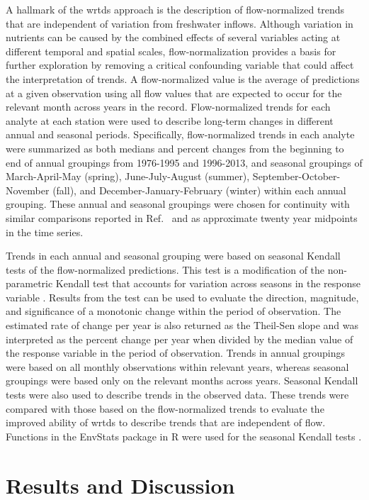 \documentclass[journal = esthag, manuscript = article]{achemso}\usepackage[]{graphicx}\usepackage[]{color}
\begin{document}
A hallmark of the \ac{wrtds} approach is the description of flow-normalized trends that are independent of variation from freshwater inflows. Although variation in nutrients can be caused by the combined effects of several variables acting at different temporal and spatial scales, flow-normalization provides a basis for further exploration by removing a critical confounding variable that could affect the interpretation of trends. A flow-normalized value is the average of predictions at a given observation using all flow values that are expected to occur for the relevant month across years in the record.  Flow-normalized trends for each analyte at each station were used to describe long-term changes in different annual and seasonal periods.  Specifically, flow-normalized trends in each analyte were summarized as both medians and percent changes from the beginning to end of annual groupings from 1976-1995 and 1996-2013, and seasonal groupings of March-April-May (spring), June-July-August (summer), September-October-November (fall), and December-January-February (winter) within each annual grouping. These annual and seasonal groupings were chosen for continuity with similar comparisons reported in Ref.~ and as approximate twenty year midpoints in the time series.  

Trends in each annual and seasonal grouping were based on seasonal Kendall tests of the flow-normalized predictions. This test is a modification of the non-parametric Kendall test that accounts for variation across seasons in the response variable \cite{Hirsch82}.  Results from the test can be used to evaluate the direction, magnitude, and significance of a monotonic change within the period of observation.  The estimated rate of change per year is also returned as the Theil-Sen slope and was interpreted as the percent change per year when divided by the median value of the response variable in the period of observation.\cite{Jassby08}  Trends in annual groupings were based on all monthly observations within relevant years, whereas seasonal groupings were based only on the relevant months across years.  Seasonal Kendall tests were also used to describe trends in the observed data.  These trends were compared with those based on the flow-normalized trends to evaluate the improved ability of \ac{wrtds} to describe trends that are independent of flow.  Functions in the EnvStats package in R were used for the seasonal Kendall tests \cite{Millard13}. 

\section{Results and Discussion}
\end{document}
